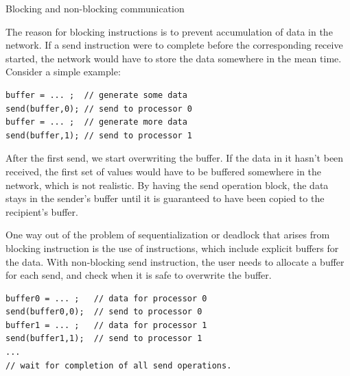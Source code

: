 {Blocking and non-blocking communication}

The reason for blocking instructions is to prevent accumulation of
data in the network. If a send instruction were to complete before the
corresponding receive started, the network would have to store the
data somewhere in the mean time.
Consider a simple example:
\begin{verbatim}
buffer = ... ;  // generate some data
send(buffer,0); // send to processor 0
buffer = ... ;  // generate more data
send(buffer,1); // send to processor 1
\end{verbatim}
After the first send, we start overwriting the buffer. If the data in
it hasn't been received, the first set of values would have to be
buffered somewhere in the network, which is not realistic.
By having the send operation block,
the data stays in the sender's buffer until it is guaranteed to have
been copied to the recipient's buffer.

One way out of the problem of sequentialization or deadlock that
arises from blocking instruction is the use
of  instructions, which include
explicit buffers for the data. With non-blocking send instruction, the
user needs to allocate a buffer for each send, and check when it is
safe to overwrite the buffer.
\begin{verbatim}
buffer0 = ... ;   // data for processor 0
send(buffer0,0);  // send to processor 0
buffer1 = ... ;   // data for processor 1
send(buffer1,1);  // send to processor 1
...
// wait for completion of all send operations.
\end{verbatim}

